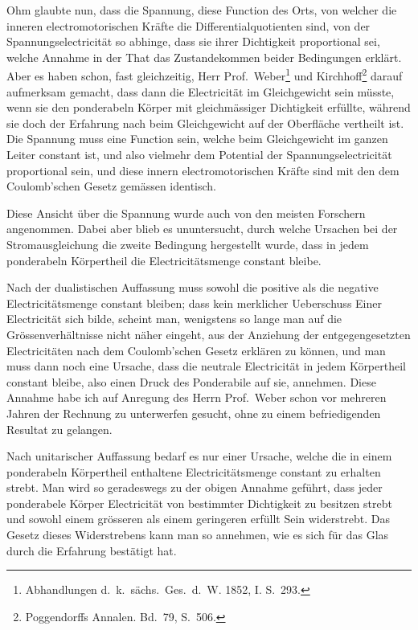 \documentclass[12pt,a4paper]{book}
\theoremstyle{definition}
\theoremstyle{remark}
\begin{document}
Ohm glaubte nun, dass die Spannung, diese Function des Orts, von welcher die inneren electromotorischen Kräfte die Differentialquotienten sind, von der Spannungselectricität so abhinge, dass sie ihrer Dichtigkeit proportional sei, welche Annahme in der That das Zustandekommen beider Bedingungen erklärt. Aber es haben schon, fast gleichzeitig, Herr Prof.~Weber\footnote{Abhandlungen d.\ k.\ sächs.\ Ges.\ d.\ W. 1852, I. S.~293.} und Kirchhoff\footnote{Poggendorffs Annalen. Bd.~79, S.~506.} darauf aufmerksam gemacht, dass dann die Electricität im Gleichgewicht sein müsste, wenn sie den ponderabeln Körper mit gleichmässiger Dichtigkeit erfüllte, während sie doch der Erfahrung nach beim Gleichgewicht auf der Oberfläche vertheilt ist. Die Spannung muss eine Function sein, welche beim Gleichgewicht im ganzen Leiter constant ist, und also vielmehr dem Potential der Spannungselectricität proportional sein, und diese innern electromotorischen Kräfte sind mit den dem Coulomb'schen Gesetz gemässen identisch.

Diese Ansicht über die Spannung wurde auch von den meisten Forschern angenommen. Dabei aber blieb es ununtersucht, durch welche Ursachen bei der Stromausgleichung die zweite Bedingung hergestellt wurde, dass in jedem ponderabeln Körpertheil die Electricitätsmenge constant bleibe.

Nach der dualistischen Auffassung muss sowohl die positive als die negative Electricitätsmenge constant bleiben; dass kein merklicher Ueberschuss Einer Electricität sich bilde, scheint man, wenigstens so lange man auf die Grössenverhältnisse nicht näher eingeht, aus der Anziehung der entgegengesetzten Electricitäten nach dem Coulomb'schen Gesetz erklären zu können, und man muss dann noch eine Ursache, dass die neutrale Electricität in jedem Körpertheil constant bleibe, also einen Druck des Ponderabile auf sie, annehmen. Diese Annahme habe ich auf Anregung des Herrn Prof.~Weber schon vor mehreren Jahren der Rechnung zu unterwerfen gesucht, ohne zu einem befriedigenden Resultat zu gelangen.

Nach unitarischer Auffassung bedarf es nur einer Ursache, welche die in einem ponderabeln Körpertheil enthaltene Electricitätsmenge constant zu erhalten strebt. Man wird so geradeswegs zu der obigen Annahme geführt, dass jeder ponderabele Körper Electricität von bestimmter Dichtigkeit zu besitzen strebt und sowohl einem grösseren als einem geringeren erfüllt Sein widerstrebt. Das Gesetz dieses Widerstrebens kann man so annehmen, wie es sich für das Glas durch die Erfahrung bestätigt hat.
\end{document}
